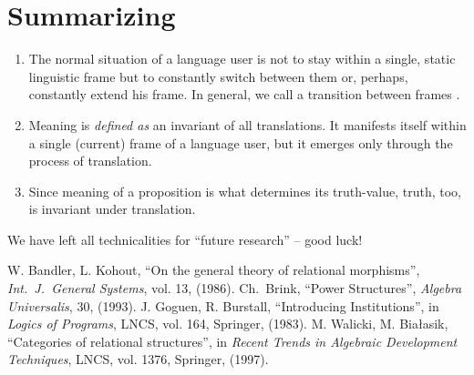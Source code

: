 \documentclass[10pt]{article}
\begin{document}
\section{Summarizing}
\begin{enumerate}
\item The normal situation of a language user is not to stay within a single, 
static linguistic frame but to constantly switch between them or, perhaps, constantly
extend his frame. In general, we call a transition between frames .
\item Meaning is {\em defined as} an invariant of all translations. It manifests 
itself within a single (current) frame of a language user, but it emerges only through
the process of translation.
\item Since meaning of a proposition is what determines its truth-value, truth, too, 
is invariant under translation.
\end{enumerate}
We have left all technicalities for ``future research'' -- good luck!
\begin{thebibliography}{MM99}\MyLPar
{} W. Bandler, L. Kohout, ``On the general theory of relational 
  morphisms'', {\em Int.~J.~General Systems}, vol. 13, (1986).
 Ch.~Brink, 
  ``Power Structures'', {\em Algebra Universalis}, 30, (1993).
 J. Goguen, R. Burstall, ``Introducing Institutions'', in
 {\em Logics of Programs}, LNCS, vol. 164, Springer, (1983).
 M. Walicki, M. Bia{\l}asik, ``Categories of relational structures'', 
 in {\em Recent Trends in Algebraic Development Techniques}, LNCS, vol. 1376, Springer, 
 (1997).


\end{thebibliography}
\end{document}
